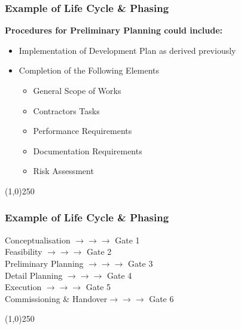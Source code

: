 \begin{frame}
\frametitle{Example of Life Cycle \& Phasing}
\textbf{Procedures for Preliminary Planning could include:}\\
\begin{itemize}
	\item Implementation of Development Plan as derived previously
	\item Completion of the Following Elements
	\begin{itemize}
		\item General Scope of Works
		\item Contractors Tasks
		\item Performance Requirements
		\item Documentation Requirements
		\item Risk Assessment
	\end{itemize}
\end{itemize}
\end{frame}
\begin{center}\line(1,0){250}\end{center}



\begin{frame}
\frametitle{Example of Life Cycle \& Phasing}
Conceptualisation \hfill$\longrightarrow\longrightarrow\longrightarrow$ Gate 1\\
Feasibility \hfill$\longrightarrow\longrightarrow\longrightarrow$ Gate 2\\
Preliminary Planning \hfill$\longrightarrow\longrightarrow\longrightarrow$ Gate 3\\
Detail Planning \hfill$\longrightarrow\longrightarrow\longrightarrow$ Gate 4\\
Execution \hfill$\longrightarrow\longrightarrow\longrightarrow$ Gate 5\\
Commissioning \& Handover\hfill$\longrightarrow\longrightarrow\longrightarrow$ Gate 6\\
\end{frame}
\begin{center}\line(1,0){250}\end{center}





